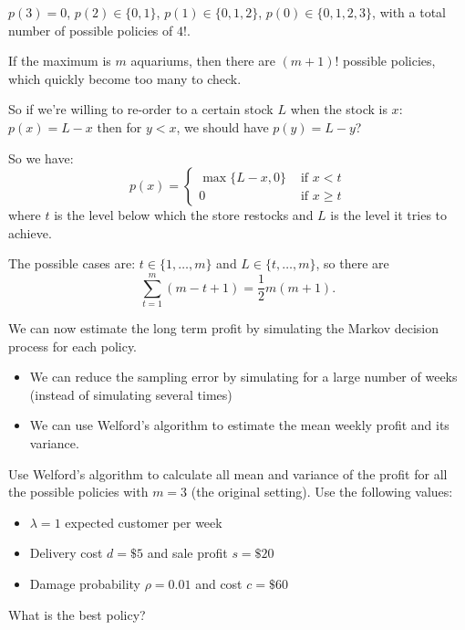 \begin{solution}
\begin{slide}
\begin{parts}

	\item $p(3) = 0$, $p(2)\in\{0,1\}$, $p(1)\in\{0,1,2\}$, $p(0)\in\{0,1,2,3\}$, with a total number of possible policies of $4!$.

	\item If the maximum is $m$ aquariums, then there are $(m+1)!$ possible policies, which quickly become too many to check.

	\item So if we're willing to re-order to a certain stock $L$ when  the stock is $x$: $p(x) = L-x$
		then for $y<x$, we should have $p(y)= L-y$?

	\item So we have:
	\[ 
	p(x) = \begin{cases}
			\max\{L-x,0\}	& \text{ if } x < t 	 \\
			0 				& \text{ if } x \geq t 	
		 \end{cases}
	\]
	where $t$ is the level below which the store restocks and $L$ is the level it tries to achieve.

	The possible cases are: $t \in \{1, \ldots, m\}$ and $L \in \{t, \ldots, m\}$, so there are
	\[\sum_{t=1}^m (m-t+1) =\frac12 m(m+1).
	\]
\end{parts}
\end{slide}	
\end{solution}


\begin{slide}


We can now estimate the long term profit by simulating the Markov decision process for each policy.

\begin{itemize}
	\item We can reduce the sampling error by simulating for a large number of weeks (instead of simulating several times)
	\item We can use Welford's algorithm to estimate the mean weekly profit and its variance.
\end{itemize}

\begin{parts}
	\item Use Welford's algorithm to calculate all mean and variance of the profit for all the possible policies with $m=3$ (the original setting).
	Use the following values: 
	\begin{itemize}
		\item $\lambda=1$ expected customer per week
		\item Delivery cost $d=\$5$ and sale profit $s=\$20$
		\item Damage probability $\rho=0.01$ and cost $c=\$60$
	\end{itemize}
	
	What is the best policy?
\end{parts}	
	
\end{slide}


